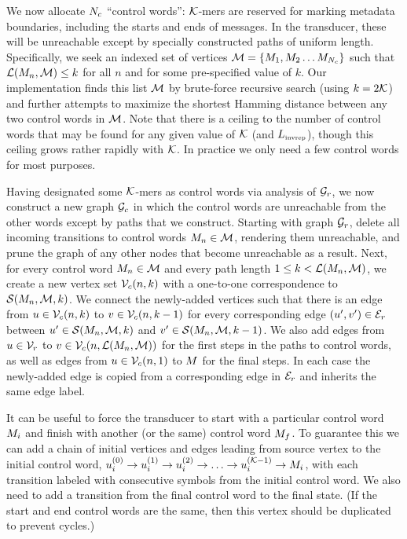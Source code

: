 \documentclass[english]{article}
\begin{document}
We now allocate $N_c$ ``control words'': ${\cal K}$-mers are reserved for marking metadata boundaries,
including the starts and ends of messages.
In the transducer, these will be unreachable except by specially constructed paths of uniform length.
Specifically, we seek an indexed set of vertices
${\cal M} = \{ M_1, M_2 \ldots M_{N_c} \}$
such that ${\cal L}(M_n,{\cal M}) \leq k$ for all $n$
and for some pre-specified value of $k$.
Our implementation finds this list ${\cal M}$ by brute-force recursive search
(using $k = 2{\cal K}$)
and further attempts to maximize the shortest Hamming distance between any two control words in ${\cal M}$.
Note that there is a ceiling to the number of control words that may be found
for any given value of ${\cal K}$ (and $L_{\mbox{\tiny invrep}}$),
though this ceiling grows rather rapidly with ${\cal K}$.
In practice we only need a few control words for most purposes.

Having designated some ${\cal K}$-mers as control words via analysis of ${\cal G}_r$,
we now construct a new graph ${\cal G}_c$
in which the control words are unreachable from the other words
except by paths that we construct.
Starting with graph ${\cal G}_r$, delete all incoming transitions to control words $M_n \in {\cal M}$,
rendering them unreachable,
and prune the graph of any other nodes that become unreachable as a result.
Next, for every control word $M_n \in {\cal M}$
and every path length $1 \leq k < {\cal L}(M_n,{\cal M})$,
we create a new vertex set ${\cal V}_c(n,k)$
with a one-to-one correspondence to ${\cal S}(M_n,{\cal M},k)$.
We connect the newly-added vertices such that there is an edge from
$u \in {\cal V}_c(n,k)$ to $v \in {\cal V}_c(n,k-1)$
for every corresponding edge $(u',v') \in {\cal E}_r$ between
$u' \in {\cal S}(M_n,{\cal M},k)$
and
$v' \in {\cal S}(M_n,{\cal M},k-1)$.
We also add edges from
$u \in {\cal V}_r$ to $v \in {\cal V}_c(n,{\cal L}(M_n,{\cal M}))$
for the first steps in the paths to control words,
as well as edges from
$u \in {\cal V}_c(n,1)$ to $M$
for the final steps.
In each case the newly-added edge is copied from a corresponding edge in ${\cal E}_r$
and inherits the same edge label.

It can be useful to force the transducer to start with a particular control word $M_i$
and finish with another (or the same) control word $M_f$.
To guarantee this we can add a chain of initial vertices and edges leading from source vertex to the initial control word,
$u^{(0)}_i \to u^{(1)}_i \to u^{(2)}_i \to \ldots \to u^{({\cal K}-1)}_i \to M_i$,
with each transition labeled with consecutive symbols from the initial control word.
We also need to add a transition from the final control word to the final state.
(If the start and end control words are the same, then this vertex should be duplicated to prevent cycles.)
\end{document}
